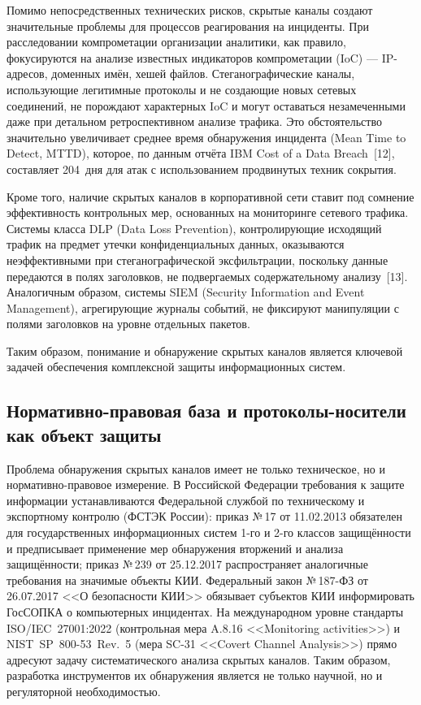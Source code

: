 Помимо непосредственных технических рисков, скрытые каналы создают значительные проблемы для процессов реагирования на инциденты. При расследовании компрометации организации аналитики, как правило, фокусируются на анализе известных индикаторов компрометации (IoC) --- IP-адресов, доменных имён, хешей файлов. Стеганографические каналы, использующие легитимные протоколы и не создающие новых сетевых соединений, не порождают характерных IoC и могут оставаться незамеченными даже при детальном ретроспективном анализе трафика. Это обстоятельство значительно увеличивает среднее время обнаружения инцидента (Mean Time to Detect, MTTD), которое, по данным отчёта IBM Cost of a Data Breach~[12], составляет 204~дня для атак с использованием продвинутых техник сокрытия.

Кроме того, наличие скрытых каналов в корпоративной сети ставит под сомнение эффективность контрольных мер, основанных на мониторинге сетевого трафика. Системы класса DLP (Data Loss Prevention), контролирующие исходящий трафик на предмет утечки конфиденциальных данных, оказываются неэффективными при стеганографической эксфильтрации, поскольку данные передаются в полях заголовков, не подвергаемых содержательному анализу~[13]. Аналогичным образом, системы SIEM (Security Information and Event Management), агрегирующие журналы событий, не фиксируют манипуляции с полями заголовков на уровне отдельных пакетов.

Таким образом, понимание и обнаружение скрытых каналов является ключевой задачей обеспечения комплексной защиты информационных систем.

\subsection{Нормативно-правовая база и протоколы-носители как объект защиты}

Проблема обнаружения скрытых каналов имеет не только техническое, но и нормативно-правовое измерение. В Российской Федерации требования к защите информации устанавливаются Федеральной службой по техническому и экспортному контролю (ФСТЭК России): приказ №\,17 от 11.02.2013 обязателен для государственных информационных систем 1-го и 2-го классов защищённости и предписывает применение мер обнаружения вторжений и анализа защищённости; приказ №\,239 от 25.12.2017 распространяет аналогичные требования на значимые объекты КИИ. Федеральный закон №\,187-ФЗ от 26.07.2017 <<О безопасности КИИ>> обязывает субъектов КИИ информировать ГосСОПКА о компьютерных инцидентах. На международном уровне стандарты ISO/IEC~27001:2022 (контрольная мера A.8.16 <<Monitoring activities>>) и NIST~SP~800-53~Rev.~5 (мера SC-31 <<Covert Channel Analysis>>) прямо адресуют задачу систематического анализа скрытых каналов. Таким образом, разработка инструментов их обнаружения является не только научной, но и регуляторной необходимостью.

